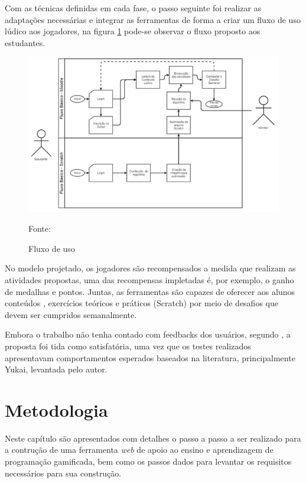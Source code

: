 \pagebreak

Com as técnicas definidas em cada fase, o passo seguinte foi realizar as adaptações necessárias e integrar as ferramentas de forma a criar
um fluxo de uso lúdico aos jogadores, na figura \ref{fluxo} pode-se observar o fluxo proposto aos estudantes.

\begin{figure}[h]
	\centering
	\includegraphics[keepaspectratio=true,scale=0.55]{figuras/fluxo.png}
	\caption{Fluxo de uso}
	Fonte: \cite{wilker}
	\label{fluxo}
\end{figure}

No modelo projetado, os jogadores são recompensados a medida que realizam as atividades propostas, uma das recompensas
impletadas é, por exemplo, o ganho de medalhas e pontos. Juntas, as ferramentas são capazes de oferecer aos alunos conteúdos 
, exercícios teóricos e práticos (Scratch) por meio de desafios que devem ser cumpridos semanalmente.

Embora o trabalho não tenha contado com feedbacks dos usuários, segundo , a proposta foi tida
como satisfatória, uma vez que os testes realizados apresentavam comportamentos esperados baseados na literatura, principalmente
Yukai, levantada pelo autor.


\chapter{Metodologia}
Neste capítulo são apresentados com detalhes o passo a passo a ser realizado para a contrução de uma ferramenta \textit{web}
de apoio ao ensino e aprendizagem de programação gamificada, bem como os passos dados para levantar os requisitos necessários
para sua construção.

